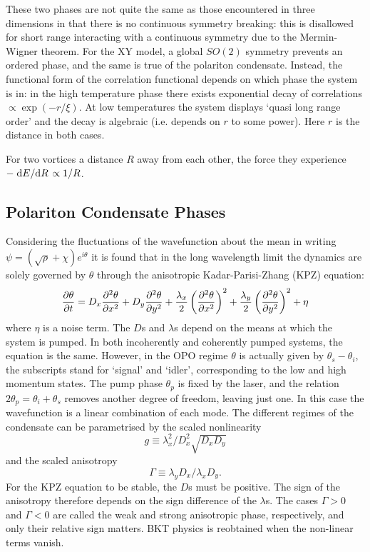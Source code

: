 \documentclass[letterpaper, 10 pt, conference]{IEEEtran}  %
\begin{document}
These two phases are not quite the same as those encountered in three dimensions in that there is no continuous symmetry breaking: this is disallowed for short range interacting with a continuous symmetry due to the Mermin-Wigner theorem. 
For the XY model, a global $SO(2)$ symmetry prevents an ordered phase, and the same is true of the polariton condensate. 
Instead, the functional form of the correlation functional depends on which phase the system is in: in the high temperature phase there exists exponential decay of correlations $\propto \exp (-r / \xi)$. 
At low temperatures the system displays `quasi long range order' and the decay is algebraic (i.e. depends on $r$ to some power).
Here $r$ is the distance in both cases. 
 
For two vortices a distance $R$ away from each other, the force they experience $-\dv*{E}{R} \propto 1/R$. 

\subsection{Polariton Condensate Phases}

Considering the fluctuations of the wavefunction about the mean in writing $\psi = (\sqrt{\rho} + \chi)e^{i \theta}$ it is found that in the long wavelength limit the dynamics are solely governed by $\theta$ through the anisotropic Kadar-Parisi-Zhang (KPZ) equation:
\[
\pdv{\theta}{t} = D_x \pdv[2]{\theta}{x} + D_y \pdv[2]{\theta}{y} + \frac{\lambda_x}{2}\left ( \pdv[2]{\theta}{x} \right)^2 + \frac{\lambda_y}{2} \left (\pdv[2]{\theta}{y} \right)^2 + \eta
\]
where $\eta$ is a noise term. 
The $D$s and $\lambda$s depend on the means at which the system is pumped. 
In both incoherently and coherently pumped systems, the equation is the same. 
However, in the OPO regime $\theta$ is actually given by $\theta_s - \theta_i$, the subscripts stand for `signal' and `idler', corresponding to the low and high momentum states.
The pump phase $\theta_p$ is fixed by the laser, and the relation $2 \theta_p = \theta_i + \theta_s$ removes another degree of freedom, leaving just one.  
In this case the wavefunction is a linear combination of each mode.
The different regimes of the condensate can be parametrised by the scaled nonlinearity 
\[
g \equiv \lambda_x^2/D_x^2\sqrt{D_x D_y}
\]
and the scaled anisotropy 
\[
\Gamma \equiv \lambda_y D_x / \lambda_x D_y.
\] 
For the KPZ equation to be stable, the $D$s must be positive.
The sign of the anisotropy therefore depends on the sign difference of the $\lambda$s. 
The cases $\Gamma > 0$ and $\Gamma < 0$ are called the weak and strong anisotropic phase, respectively, and only their relative sign matters.
BKT physics is reobtained when the non-linear terms vanish.
\end{document}
